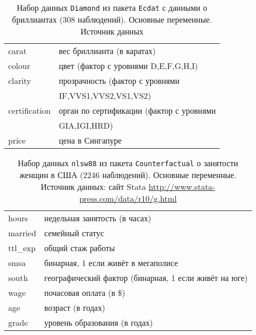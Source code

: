 \documentclass[12pt]{article}
\theoremstyle{remark}
\begin{document}
\begin{table}
	\caption{Набор данных \texttt{Diamond}
	из пакета \texttt{Ecdat} с данными о  бриллиантах
	(308  наблюдений). Основные переменные.
	Источник данных \cite{Diamonds}}
	\label{Diamond}
	\begin{tabular}{l|l}\hline
	carat & вес бриллианта (в каратах) \\
	colour  &  цвет (фактор с уровнями D,E,F,G,H,I) \\
	clarity & прозрачность (фактор с уровнями \\
	& IF,VVS1,VVS2,VS1,VS2) \\
	certification & орган по сертификации (фактор с уровнями \\
	& GIA,IGI,HRD) \\
	price & цена в Сингапуре \\
	\hline
	\end{tabular}
\end{table}

\begin{table}
	\caption{Набор данных \texttt{nlsw88}
	из пакета \texttt{Counterfactual} о занятости женщин в США
	(2246  наблюдений). Основные переменные.
	Источник данных: сайт Stata \url{http://www.stata-press.com/data/r10/g.html} }
	\label{nlsw88}
	\begin{tabular}{l|l}\hline
	hours & недельная занятость (в часах) \\
	married & семейный статус \\
	ttl\_exp & общий стаж работы \\
	smsa  & бинарная, 1 если живёт в мегаполисе \\
	south & географический фактор (бинарная, 1 если живёт на юге) \\
	wage & почасовая оплата  (в \$) \\
	age & возраст (в годах)  \\
	grade & уровень образования (в годах) \\
	\hline
	\end{tabular}
\end{table}
\end{document}
